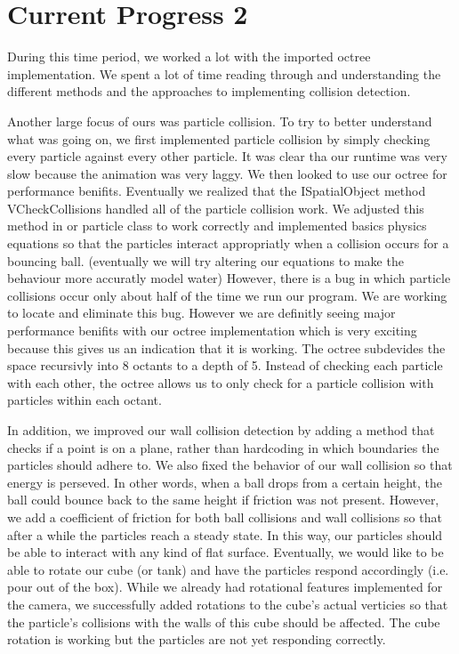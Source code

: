 \section{Current Progress 2}

During this time period, we worked a lot with the imported octree implementation.  We spent a lot of time reading through and understanding the different methods and the approaches to implementing collision detection.  

Another large focus of ours was particle collision.  To try to better understand what was going on, we first implemented particle collision by simply checking every particle against every other particle.  It was clear tha our runtime was very slow because the animation was very laggy. We then looked to use our octree for performance benifits. Eventually we realized that the ISpatialObject method VCheckCollisions handled all of the particle collision work.  We adjusted this method in or particle class to work correctly and implemented basics physics equations so that the particles interact appropriatly when a collision occurs for a bouncing ball. (eventually we will try altering our equations to make the behaviour more accuratly model water)  However, there is a bug in which particle collisions occur only about half of the time we run our program.  We are working to locate and eliminate this bug. However we are definitly seeing major performance benifits with our octree implementation which is very exciting because this gives us an indication that it is working. The octree subdevides the space recursivly into 8 octants to a depth of 5. Instead of checking each particle with each other, the octree allows us to only check for a particle collision with particles within each octant. 

In addition, we improved our wall collision detection by adding a method that checks if a point is on a plane, rather than hardcoding in which boundaries the particles should adhere to. We also fixed the behavior of our wall collision so that energy is perseved. In other words, when a ball drops from a certain height, the ball could bounce back to the same height if friction was not present. However, we add a coefficient of friction for both ball collisions and wall collisions so that after a while the particles reach a steady state.  In this way, our particles should be able to interact with any kind of flat surface.  Eventually, we would like to be able to rotate our cube (or tank) and have the particles respond accordingly (i.e. pour out of the box).  While we already had rotational features implemented for the camera, we successfully added rotations to the cube's actual verticies so that the particle's collisions with the walls of this cube should be affected.  The cube rotation is working but the particles are not yet responding correctly.  

